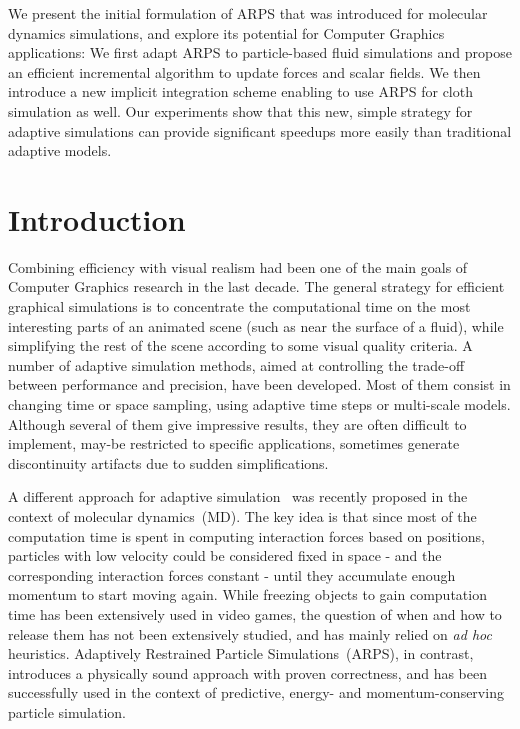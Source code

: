 \documentclass[11pt, oneside, a4paper]{memoir}
\begin{document}
We present the initial formulation of ARPS that was introduced for molecular dynamics simulations, and explore its potential for Computer Graphics applications:
We first adapt ARPS to particle-based fluid simulations and propose an efficient incremental algorithm to update forces and scalar fields.
We then introduce a new implicit integration scheme enabling to use ARPS for cloth simulation as well.
Our experiments show that this new, simple strategy for adaptive simulations can provide significant speedups more easily than traditional adaptive models.

\section{Introduction}
Combining efficiency with visual realism had been one of the main goals of Computer Graphics research in the last decade. The general strategy for efficient graphical simulations is to concentrate the computational time on the most interesting parts of an animated scene (such as near the surface of a fluid), while simplifying the rest of the scene according to some visual quality criteria. A number of adaptive simulation methods, aimed at controlling the trade-off between performance and precision, have been developed. Most of them consist in changing time or space sampling, using adaptive time steps or multi-scale models.
Although several of them give impressive results, they are often difficult to implement, may-be restricted to specific applications, sometimes generate discontinuity artifacts due to sudden simplifications.

A different approach for adaptive simulation~\cite{Artemova2012} was recently proposed in the context of molecular dynamics~(MD).
The key idea is that since most of the computation time is spent in computing interaction forces based on positions, particles with low velocity could be considered fixed in space - and the corresponding interaction forces constant - until they accumulate enough momentum to start moving again.
While freezing objects to gain computation time has been extensively used in video games, the question of when and how to release them has not been extensively studied, and has mainly relied on \textit{ad hoc} heuristics.
Adaptively Restrained Particle Simulations~(ARPS), in contrast, introduces a physically sound approach with proven correctness, and has been successfully used in the context of predictive, energy- and momentum-conserving particle simulation.
\end{document}
